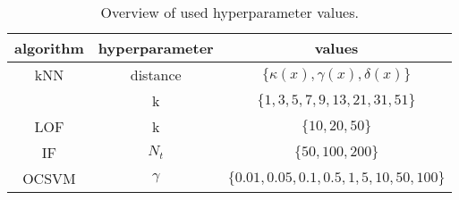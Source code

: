 \begin{table}
	\centering
	\begin{tabular}{c | c c}
		algorithm & hyperparameter & values \\
		\hline
		kNN & distance & $\lbrace \kappa(x), \gamma(x), \delta(x) \rbrace$  \\
		    & k & $\lbrace 1, 3, 5, 7, 9, 13, 21, 31, 51 \rbrace$ \\
		LOF & k & $\lbrace 10, 20, 50 \rbrace$ \\
		IF & $N_t$ & $\lbrace 50, 100, 200 \rbrace$ \\
		OCSVM & $\gamma$ &$\lbrace 0.01, 0.05, 0.1, 0.5, 1, 5, 10, 50, 100 \rbrace$ \\
	\end{tabular}
	\caption{Overview of used hyperparameter values.}
	\label{tab:hyperparams}
\end{table}
